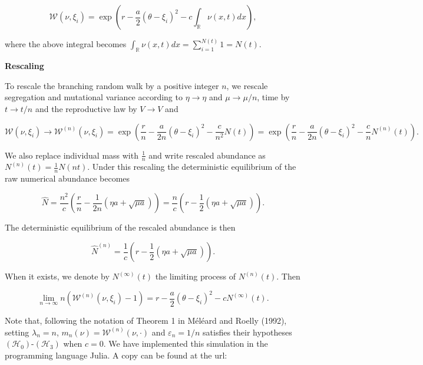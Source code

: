 \documentclass[]{article}
\begin{document}
\begin{equation}
\mathscr{W}(\nu,\xi_i)=\exp\left(r-\frac{a}{2}(\theta-\xi_i)^2-c\int_\mathbb{R}\nu(x,t)dx\right),
\end{equation}

where the above integral becomes
\(\int_\mathbb{R}\nu(x,t)dx=\sum_{i=1}^{N(t)}1=N(t)\).

\textbf{Rescaling}

To rescale the branching random walk by a positive integer \(n\), we
rescale segregation and mutational variance according to
\(\eta\to \eta\) and \(\mu\to \mu/n\), time by \(t\to t/n\) and the
reproductive law by \(V\to V\) and

\begin{equation}
\mathscr W(\nu,\xi_i)\to\mathscr W^{(n)}(\nu,\xi_i)=\exp\left(\frac{r}{n}-\frac{a}{2n}(\theta-\xi_i)^2-\frac{c}{n^2}N(t)\right)=\exp\left(\frac{r}{n}-\frac{a}{2n}(\theta-\xi_i)^2-\frac{c}{n}N^{(n)}(t)\right).
\end{equation}

We also replace individual mass with \(\frac{1}{n}\) and write rescaled
abundance as \(N^{(n)}(t)=\frac{1}{n}N(nt)\). Under this rescaling the
deterministic equilibrium of the raw numerical abundance becomes

\begin{equation}
\hat N=\frac{n^2}{c}\left(\frac{r}{n}-\frac{1}{2n}(\eta a+\sqrt{\mu a})\right)=\frac{n}{c}\left(r-\frac{1}{2}(\eta a+\sqrt{\mu a})\right).
\end{equation}

The deterministic equilibrium of the rescaled abundance is then

\begin{equation}
\hat N^{(n)}=\frac{1}{c}\left(r-\frac{1}{2}(\eta a+\sqrt{\mu a})\right).
\end{equation}

When it exists, we denote by \(N^{(\infty)}(t)\) the limiting process of
\(N^{(n)}(t)\). Then

\begin{equation}
\lim_{n\to\infty}n\left(\mathscr W^{(n)}(\nu,\xi_i)-1\right)=r-\frac{a}{2}(\theta-\xi_i)^2-cN^{(\infty)}(t).
\end{equation}

Note that, following the notation of Theorem 1 in Méléard and Roelly
(1992), setting \(\lambda_n=n\),
\(m_n(\nu)=\mathscr W^{(n)}(\nu,\cdot)\) and \(\varepsilon_n=1/n\)
satisfies their hypotheses \((\mathscr H_0)\)-\((\mathscr H_3)\) when
\(c=0\). We have implemented this simulation in the programming language
Julia. A copy can be found at the url:
\end{document}
